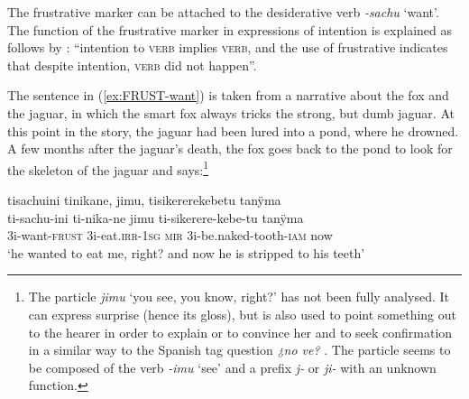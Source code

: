 


The frustrative marker can be attached to the desiderative verb \textit{-sachu} ‘want’. The function of the frustrative marker in expressions of intention is explained as follows by \citet[489]{Overall2017}: “intention to \textsc{verb} implies \textsc{verb}, and the use of frustrative indicates that despite intention, \textsc{verb} did not happen”.

The sentence in (\ref{ex:FRUST-want}) is taken from a narrative about the fox and the jaguar, in which the smart fox always tricks the strong, but dumb jaguar. At this point in the story, the jaguar had been lured into a pond, where he drowned. A few months after the jaguar's death, the fox goes back to the pond to look for the skeleton of the jaguar and says:\footnote{The  particle \textit{jimu} ‘you see, you know, right?’ has not been fully analysed. It can express surprise (hence its gloss), but is also used to point something out to the hearer in order to explain or to convince her and to seek confirmation in a similar way to the Spanish tag question \textit{¿no ve?} \citep[cf.][45]{Mendoza2015}. The  particle seems to be composed of the verb \textit{-imu} ‘see’ and a prefix \textit{j-} or \textit{ji-} with an unknown function.\label{fn:mirative}}

\ea\label{ex:FRUST-want}
\begingl 
\glpreamble tisachuini tinikane, jimu, tisikererekebetu tanÿma\\
\gla ti-sachu-ini ti-nika-ne jimu ti-sikerere-kebe-tu tanÿma\\ 
\glb 3i-want-\textsc{frust} 3i-eat.\textsc{irr}-1\textsc{sg} \textsc{mir} 3i-be.naked-tooth-\textsc{iam} now\\ 
\glft ‘he wanted to eat me, right? and now he is stripped to his teeth’\\ 
\endgl
\trailingcitation{[jmx-n120429ls-x5.295]}
\xe

